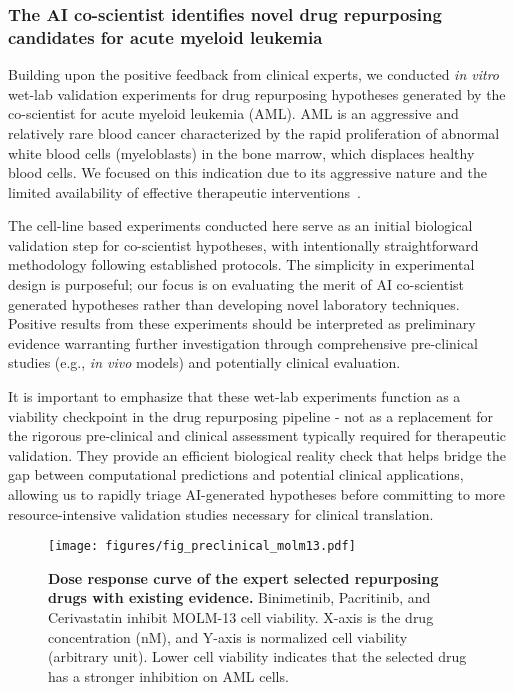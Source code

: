 \subsubsection{The AI co-scientist identifies novel drug repurposing candidates for acute myeloid leukemia}

Building upon the positive feedback from clinical experts, we conducted \textit{in vitro} wet-lab validation experiments for drug repurposing hypotheses generated by the co-scientist for acute myeloid leukemia (AML). AML is an aggressive and relatively rare blood cancer characterized by the rapid proliferation of abnormal white blood cells (myeloblasts) in the bone marrow, which displaces healthy blood cells. We focused on this indication due to its aggressive nature and the limited availability of effective therapeutic interventions~\citep{dohner2015acute}.

The cell-line based experiments conducted here serve as an initial biological validation step for co-scientist hypotheses, with intentionally straightforward methodology following established protocols. The simplicity in experimental design is purposeful; our focus is on evaluating the merit of AI co-scientist generated hypotheses rather than developing novel laboratory techniques. Positive results from these experiments should be interpreted as preliminary evidence warranting further investigation through comprehensive pre-clinical studies (e.g., \textit{in vivo} models) and potentially clinical evaluation.

It is important to emphasize that these wet-lab experiments function as a viability checkpoint in the drug repurposing pipeline - not as a replacement for the rigorous pre-clinical and clinical assessment typically required for therapeutic validation. They provide an efficient biological reality check that helps bridge the gap between computational predictions and potential clinical applications, allowing us to rapidly triage AI-generated hypotheses before committing to more resource-intensive validation studies necessary for clinical translation.

\begin{figure}[ht!]
\centering
\texttt{[image: figures/fig\_preclinical\_molm13.pdf]}
\vspace{0.1cm}
\caption{\textbf{Dose response curve of the expert selected repurposing drugs with existing evidence.} Binimetinib, Pacritinib, and Cerivastatin inhibit MOLM-13 cell viability. X-axis is the drug concentration (nM), and Y-axis is normalized cell viability (arbitrary unit). Lower cell viability indicates that the selected drug has a stronger inhibition on AML cells.}
\label{fig:fig_wetlab_preclinical}
\end{figure}

